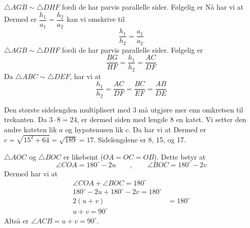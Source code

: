 $ \triangle AGB \sim \triangle DHF $ fordi de har parvis parallelle sider. Følgelig er 
Nå har vi at
Dermed er
$\dfrac{h_1}{a_1}=\dfrac{h_2}{a_2}$ kan vi omskrive til
\[ \frac{h_1}{h_2}=\frac{a_1}{a_2} \]
$ \triangle AGB \sim \triangle DHF $ fordi de har parvis parallelle sider. Følgelig er
\[ \frac{BG}{HF}=\frac{h_1}{h_2}=\frac{AC}{DF} \]
Da $\triangle ABC\sim \triangle DEF$, har vi at
\[ \frac{h_1}{h_2}=\frac{AC}{DF}=\frac{BC}{EF}=\frac{AB}{DE} \]

\newpage
{}


Den største sidelengden multiplisert med 3 må utgjøre mer enn omkretsen til trekanten. Da $3\cdot8=24$, er dermed siden med lengde 8 en katet. Vi setter den andre kateten lik $a$ og hypotenusen lik $c$. Da har vi at
Dermed er $c=\sqrt{15^2+64}=\sqrt{189}=17$. Sidelengdene er 8, 15, og 17.

$\triangle AOC$ og $\triangle BOC$ er likebeint ($OA=OC=OB$). Dette betyr at
\[ \angle COA=180^\circ-2u\qquad,\qquad\angle BOC=180^\circ-2v\]
Dermed har vi at
\begin{align}
	\angle COA+\angle BOC =180^\circ \\
	180^\circ-2u+180^\circ-2v=180^\circ \\
	2(u+v)&=180^\circ \\
	u+v=90^\circ
\end{align}
Altså er $\angle ACB=u+v=90^\circ$.\vsk

